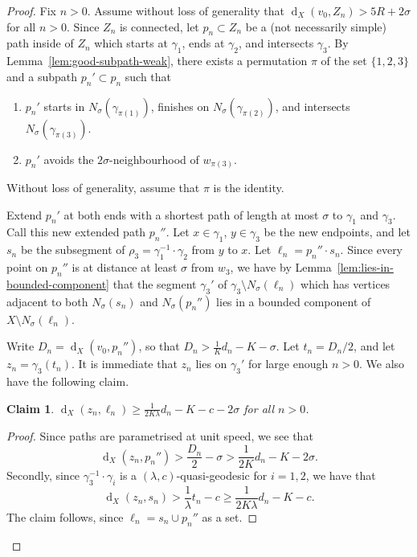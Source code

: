 \documentclass[11pt,a4paper]{amsart}
\DeclareMathOperator{\dist}{d}
\newtheorem{claim}[theorem]{Claim}
\theoremstyle{definition}
\begin{document}
\begin{proof}
    Fix $n > 0$. Assume without loss of generality that $\dist_X(v_0,Z_n) > 5R + 2\sigma$ for all $n > 0$. Since $Z_n$ is connected, let $p_n \subset Z_n$ be a (not necessarily simple) path inside of $Z_n$ which starts at $\gamma_1$, ends at $\gamma_2$, and intersects $\gamma_3$.
    By Lemma~\ref{lem:good-subpath-weak}, there exists a permutation $\pi$ of the set $\{1,2,3\}$ and a subpath $p_n' \subset p_n$ such that
    \begin{enumerate}
        \item $p_n'$ starts in $N_\sigma(\gamma_{\pi(1)})$, finishes on $N_\sigma(\gamma_{\pi(2)})$, and intersects $N_\sigma(\gamma_{\pi(3)})$.

        \item $p_n'$ avoids the $2\sigma$-neighbourhood of $w_{\pi(3)}$. 
    \end{enumerate}
    Without loss of generality, assume that $\pi$ is the identity. 

    Extend $p_n'$ at both ends with a shortest path of length at most $\sigma$ to $\gamma_1$ and $\gamma_3$. Call this new extended path $p_n''$. Let $x \in \gamma_1$, $y \in \gamma_3$ be the new endpoints, and let $s_n$ be the subsegment of $\rho_3 = \gamma_1^{-1} \cdot \gamma_2$ from $y$ to $x$. Let $\ell_n = p_n'' \cdot s_n$. Since every point on $p_n''$ is at distance at least $\sigma$ from $w_3$, we have by Lemma~\ref{lem:lies-in-bounded-component} that the segment $\gamma_3'$ of $\gamma_3 \setminus N_\sigma(\ell_n)$ which has vertices adjacent to both $N_\sigma(s_n)$ and $N_\sigma(p_n'')$ lies in a bounded component of $X \setminus N_\sigma(\ell_n)$. 

    Write $D_n = \dist_X(v_0,p_n'')$, so that $D_n > \frac 1 Kd_n-K - \sigma$. 
    Let $t_n = D_n/2$, and let $z_n = \gamma_3(t_n)$. It is immediate that $z_n$ lies on $\gamma_3'$ for large enough $n > 0$. We also have the following claim.

    \begin{claim}
        $\dist_X(z_n,\ell_n) \geq \frac {1}{2K\lambda} d_n - K - c - 2\sigma$ for all $n > 0$.
    \end{claim}

    \begin{proof}
        Since paths are parametrised at unit speed, we see that 
        $$
        \dist_X(z_n, p_n'') > \frac{D_n}2 - \sigma > \frac 1 {2K}d_n-K - 2\sigma.
        $$
        Secondly, since $\gamma_3^{-1} \cdot \gamma_i$ is a $(\lambda,c)$-quasi-geodesic for $i = 1,2$, we have that
        $$
        \dist_X(z_n,s_n) > \frac 1 \lambda t_n - c \geq \frac {1}{2K\lambda} d_n - K - c.
        $$
        The claim follows, since $\ell_n = s_n \cup p_n''$ as a set.
    \end{proof}


\end{proof}
\end{document}
